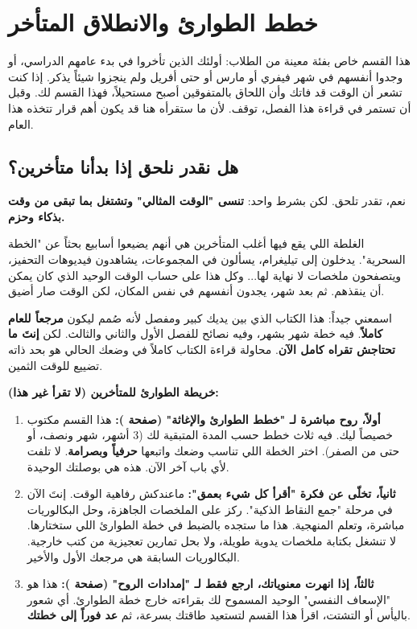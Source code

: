 \documentclass[12pt,a4paper]{book}
\newcommand{\importantAr}[1]{%
	\begin{important}
		\bfseries #1
	\end{important}
}
\begin{document}
	\section{خطط الطوارئ والانطلاق المتأخر}
	
	هذا القسم خاص بفئة معينة من الطلاب: أولئك الذين تأخروا في بدء عامهم الدراسي، أو وجدوا أنفسهم في شهر فيفري أو مارس أو حتى أفريل ولم ينجزوا شيئاً يذكر. إذا كنت تشعر أن الوقت قد فاتك وأن اللحاق بالمتفوقين أصبح مستحيلاً، فهذا القسم لك. وقبل أن تستمر في قراءة هذا الفصل، توقف. لأن ما ستقرأه هنا قد يكون أهم قرار تتخذه هذا العام.
	
	\subsection{هل نقدر نلحق إذا بدأنا متأخرين؟}
	
	نعم، تقدر تلحق. لكن بشرط واحد: \textbf{تنسى "الوقت المثالي" وتشتغل بما تبقى من وقت بذكاء وحزم.}
	
	الغلطة اللي يقع فيها أغلب المتأخرين هي أنهم يضيعوا أسابيع بحثاً عن "الخطة السحرية". يدخلون إلى تيليغرام، يسألون في المجموعات، يشاهدون فيديوهات التحفيز، ويتصفحون ملخصات لا نهاية لها... وكل هذا على حساب الوقت الوحيد الذي كان يمكن أن ينقذهم. ثم بعد شهر، يجدون أنفسهم في نفس المكان، لكن الوقت صار أضيق.
	
	اسمعني جيداً: هذا الكتاب الذي بين يديك كبير ومفصل لأنه صُمم ليكون \textbf{مرجعاً للعام كاملاً}. فيه خطة شهر بشهر، وفيه نصائح للفصل الأول والثاني والثالث. لكن \textbf{إنتَ ما تحتاجش تقراه كامل الآن}. محاولة قراءة الكتاب كاملاً في وضعك الحالي هو بحد ذاته تضييع للوقت الثمين.
	
	\importantAr{خريطة الطوارئ للمتأخرين (لا تقرأ غير هذا):}
	
	\begin{enumerate}
		\item \textbf{أولاً، روح مباشرة لـ "خطط الطوارئ والإغاثة" (صفحة \pageref{sec:psy-late-start-success}):}
		هذا القسم مكتوب خصيصاً ليك. فيه ثلاث خطط حسب المدة المتبقية لك (3 أشهر، شهر ونصف، أو حتى من الصفر). اختر الخطة اللي تناسب وضعك واتبعها \textbf{حرفياً وبصرامة}. لا تلفت لأي باب آخر الآن. هذه هي بوصلتك الوحيدة.
		
		\item \textbf{ثانياً، تخلّى عن فكرة "أقرأ كل شيء بعمق":}
		ماعندكش رفاهية الوقت. إنتَ الآن في مرحلة "جمع النقاط الذكية". ركز على الملخصات الجاهزة، وحل البكالوريات مباشرة، وتعلم المنهجية. هذا ما ستجده بالضبط في خطة الطوارئ اللي ستختارها. لا تنشغل بكتابة ملخصات يدوية طويلة، ولا بحل تمارين تعجيزية من كتب خارجية. البكالوريات السابقة هي مرجعك الأول والأخير.
		
		\item \textbf{ثالثاً، إذا انهرت معنوياتك، ارجع فقط لـ "إمدادات الروح" (صفحة \pageref{chap:soul}):}
		هذا هو "الإسعاف النفسي" الوحيد المسموح لك بقراءته خارج خطة الطوارئ. أي شعور باليأس أو التشتت، اقرأ هذا القسم لتستعيد طاقتك بسرعة، ثم \textbf{عد فوراً إلى خطتك}.
	\end{enumerate}
	
\end{document}
